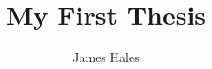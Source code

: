 \documentclass[12pt,a4paper]{book}
\begin{document}
\title{My First Thesis}
\author{James Hales}
\maketitle




\tableofcontents







\end{document}
